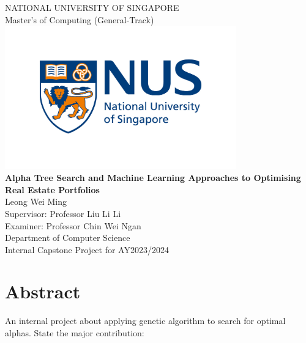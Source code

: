 \documentclass[a4paper,12pt]{report}
\numberwithin{equation}{section}
\theoremstyle{definition}
\begin{document}

\begin{center}
\Large NATIONAL UNIVERSITY OF SINGAPORE\\ 
\Large Master's of Computing (General-Track) \\ [0.2in]
\includegraphics[width=10cm]{1.nus_logo_full-horizontal} \\
\Large {\bf Alpha Tree Search and Machine Learning Approaches to Optimising Real Estate Portfolios}\\ [0.5in]
Leong Wei Ming \\
Supervisor: Professor Liu Li Li \\
Examiner: Professor Chin Wei Ngan \\ [0.3in]
Department of Computer Science \\
Internal Capstone Project for AY2023/2024
\end{center}

\chapter*{Abstract}
An internal project about applying genetic algorithm to search for optimal alphas.    
State the major contribution:
\end{document}

